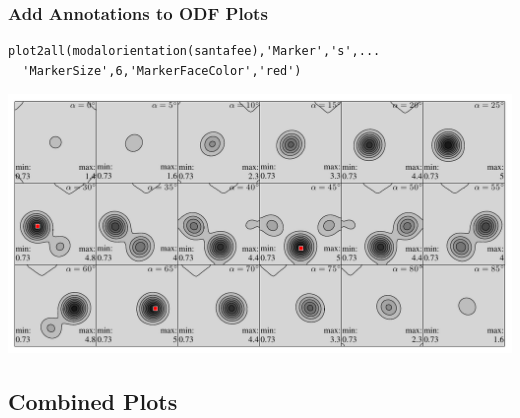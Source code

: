 \begin{frame}[fragile]
  \frametitle{Add Annotations to ODF Plots}


\begin{lstlisting}
plot2all(modalorientation(santafee),'Marker','s',...
  'MarkerSize',6,'MarkerFaceColor','red')
\end{lstlisting}

\includegraphics[width=\textwidth]{pic/odfanotate}

\end{frame}

\subsection*{Combined Plots}

